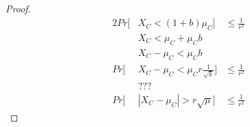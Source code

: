 \begin{proof}

    \begin{alignat*}{2}
        Pr[&X_C < (1+b)\mu_C]& \le \frac{1}{r^2}\\ 
        &X_C < \mu_C + \mu_C b&\\
        &X_C - \mu_C < \mu_C b&\\
        Pr[&X_C - \mu_C < \mu_C r \frac{1}{\sqrt{k}}]& \le \frac{1}{r^2}\\ 
        &???&\\
        Pr[&|X_C - \mu_C| > r \sqrt{\mu}] &\le \frac{1}{r^2}
    \end{alignat*}

\end{proof}

